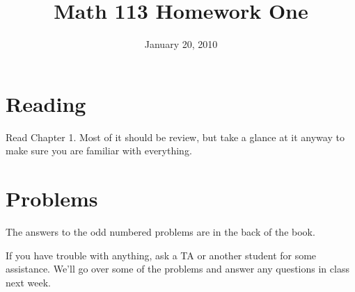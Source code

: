 \documentclass[fleqn,addpoints]{exam}
\title{Math 113 Homework One}
\author{}
\date{January 20, 2010}
\begin{document}
\printanswers

\maketitle

\section{Reading}

Read Chapter 1.  Most of it should be review, but take a glance at it anyway to make sure you are familiar with
everything.  

\section{Problems}

The answers to the odd numbered problems are in the back of the book.

If you have trouble with anything, ask a TA or another student for some assistance.  We'll go over some of the problems
and answer any questions in class next week. 
\end{document}
